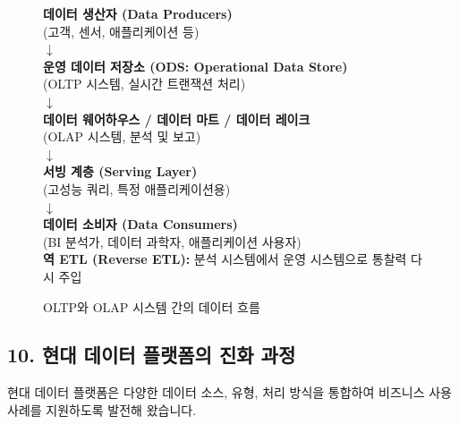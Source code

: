 \documentclass[11pt,a4paper]{article}
\begin{document}
\begin{figure}[h!]
    \centering
    \begin{tcolorbox}[colback=gray!10, colframe=gray!50!black, title={OLTP 및 OLAP 시스템의 데이터 흐름 (개념도)}]
        \centering
        \textbf{데이터 생산자 (Data Producers)} \\
        (고객, 센서, 애플리케이션 등) \\
        $\downarrow$ \\
        \textbf{운영 데이터 저장소 (ODS: Operational Data Store)} \\
        (OLTP 시스템, 실시간 트랜잭션 처리) \\
        $\downarrow$ \\
        \textbf{데이터 웨어하우스 / 데이터 마트 / 데이터 레이크} \\
        (OLAP 시스템, 분석 및 보고) \\
        $\downarrow$ \\
        \textbf{서빙 계층 (Serving Layer)} \\
        (고성능 쿼리, 특정 애플리케이션용) \\
        $\downarrow$ \\
        \textbf{데이터 소비자 (Data Consumers)} \\
        (BI 분석가, 데이터 과학자, 애플리케이션 사용자) \\
        \textbf{역 ETL (Reverse ETL):} 분석 시스템에서 운영 시스템으로 통찰력 다시 주입
    \end{tcolorbox}
    \caption{OLTP와 OLAP 시스템 간의 데이터 흐름}
    \label{fig:oltp_olap_flow}
\end{figure}

\subsection*{10. 현대 데이터 플랫폼의 진화 과정}

현대 데이터 플랫폼은 다양한 데이터 소스, 유형, 처리 방식을 통합하여 비즈니스 사용 사례를 지원하도록 발전해 왔습니다.
\end{document}
